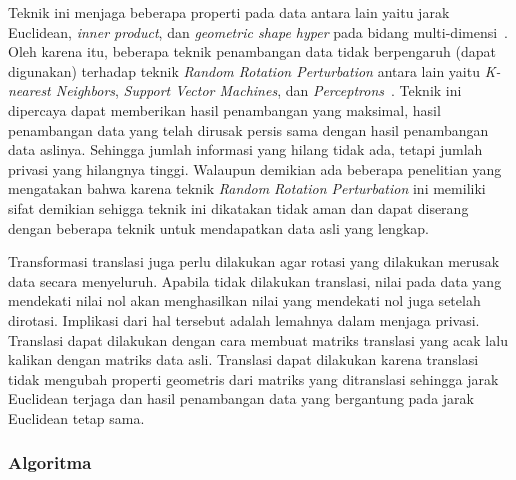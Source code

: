 Teknik ini menjaga beberapa properti pada data antara lain yaitu jarak Euclidean, \textit{inner product}, dan \textit{geometric shape hyper} pada bidang multi-dimensi~\cite{rezaseifi:11:ppdm}. Oleh karena itu, beberapa teknik penambangan data tidak berpengaruh (dapat digunakan) terhadap teknik \textit{Random Rotation Perturbation} antara lain yaitu \textit{K-nearest Neighbors}, \textit{Support Vector Machines}, dan \textit{Perceptrons}~\cite{rotation:05:chenliu}. Teknik ini dipercaya dapat memberikan hasil penambangan yang maksimal, hasil penambangan data yang telah dirusak persis sama dengan hasil penambangan data aslinya. Sehingga jumlah informasi yang hilang tidak ada, tetapi jumlah privasi yang hilangnya tinggi. Walaupun demikian ada beberapa penelitian yang mengatakan bahwa karena teknik \textit{Random Rotation Perturbation} ini memiliki sifat demikian sehigga teknik ini dikatakan tidak aman dan dapat diserang dengan beberapa teknik untuk mendapatkan data asli yang lengkap.

Transformasi translasi juga perlu dilakukan agar rotasi yang dilakukan merusak data secara menyeluruh. Apabila tidak dilakukan translasi, nilai pada data yang mendekati nilai nol akan menghasilkan nilai yang mendekati nol juga setelah dirotasi. Implikasi dari hal tersebut adalah lemahnya dalam menjaga privasi. Translasi dapat dilakukan dengan cara membuat matriks translasi yang acak lalu kalikan dengan matriks data asli. Translasi dapat dilakukan karena translasi tidak mengubah properti geometris dari matriks yang ditranslasi sehingga jarak Euclidean terjaga dan hasil penambangan data yang bergantung pada jarak Euclidean tetap sama.

\subsubsection{Algoritma}
\label{subsubsec:algo-rotation}

